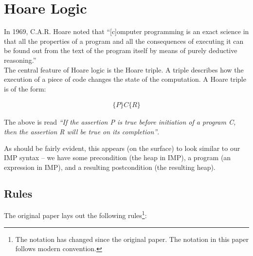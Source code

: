 \documentclass[11pt]{article}
\begin{document}
\section{Hoare Logic}
In 1969, C.A.R. Hoare noted that ``[c]omputer programming is an exact science in that all the properties of a program and all the consequences of executing it can be found out from the text of the program itself by means of purely deductive reasoning.''\cite{hoare1969axiomatic} \\

The central feature of Hoare logic is the Hoare triple. A triple describes how the execution of a piece of code changes the state of the computation. A Hoare triple is of the form:

\vspace{-1.5em}
\begin{align*}
\{P\} C \{R\}
\end{align*}

The above is read \textit{``If the assertion P is true before initiation of a program C, then the assertion R will be true on its completion''}.

As should be fairly evident, this appears (on the surface) to look similar to our IMP syntax -- we have some precondition (the heap in IMP), a program (an expression in IMP), and a resulting postcondition (the resulting heap).

\subsection{Rules}
The original paper lays out the following rules\footnote{The notation has changed since the original paper. The notation in this paper follows modern convention.}:
\end{document}
